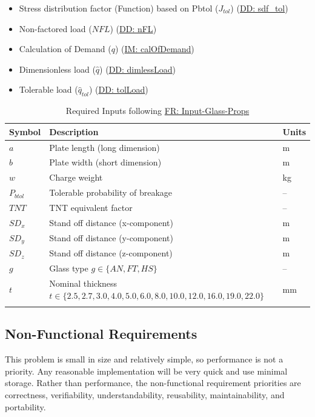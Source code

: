 \documentclass[12pt]{article}
\begin{document}
\begin{itemize}
\begin{itemize}
                                                            \item{Stress distribution factor (Function) based on Pbtol (${J_{tol}}$) (\hyperref[DD:sdf.tol]{DD: sdf\_tol})}
                                                            \item{Non-factored load ($NFL$) (\hyperref[DD:nFL]{DD: nFL})}
                                                            \item{Calculation of Demand ($q$) (\hyperref[IM:calOfDemand]{IM: calOfDemand})}
                                                            \item{Dimensionless load ($\hat{q}$) (\hyperref[DD:dimlessLoad]{DD: dimlessLoad})}
                                                            \item{Tolerable load (${\hat{q}_{tol}}$) (\hyperref[DD:tolLoad]{DD: tolLoad})}
                                                            \end{itemize}
\end{itemize}
\begin{longtabu}{l X[l] l}
\toprule
Symbol & Description & Units
\\
\midrule
\endhead
$a$ & Plate length (long dimension) & m
\\
$b$ & Plate width (short dimension) & m
\\
$w$ & Charge weight & kg
\\
${P_{btol}}$ & Tolerable probability of breakage & --
\\
$TNT$ & TNT equivalent factor & --
\\
${SD_{x}}$ & Stand off distance (x-component) & m
\\
${SD_{y}}$ & Stand off distance (y-component) & m
\\
${SD_{z}}$ & Stand off distance (z-component) & m
\\
$g$ & Glass type $g\in{}\{AN,FT,HS\}$ & --
\\
$t$ & Nominal thickness $t\in{}\{2.5,2.7,3.0,4.0,5.0,6.0,8.0,10.0,12.0,16.0,19.0,22.0\}$ & mm
\\
\bottomrule
\caption{Required Inputs following \hyperref[inputGlassProps]{FR: Input-Glass-Props}}
\label{Table:InputGlassPropsReqInputs}
\end{longtabu}
\subsection{Non-Functional Requirements}
\label{Sec:NFRs}
This problem is small in size and relatively simple, so performance is not a priority. Any reasonable implementation will be very quick and use minimal storage. Rather than performance, the non-functional requirement priorities are correctness, verifiability, understandability, reusability, maintainability, and portability.
\end{document}
